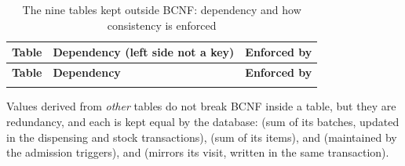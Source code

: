 {\scriptsize
\begin{longtable}{@{}R{3.2cm}R{5.0cm}R{8.6cm}@{}}
\caption{The nine tables kept outside BCNF: dependency and how consistency is enforced}\label{tab:kept}\\
\toprule
\textbf{Table} & \textbf{Dependency (left side not a key)} & \textbf{Enforced by} \\\midrule\endfirsthead
\toprule\textbf{Table} & \textbf{Dependency} & \textbf{Enforced by} \\\midrule\endhead
{}
\bottomrule
\end{longtable}}

Values derived from \emph{other} tables do not break BCNF inside a table, but they are redundancy, and each is kept
equal by the database:  (sum of its batches, updated in the dispensing and stock
transactions),  (sum of its items),  and 
(maintained by the admission triggers), and  (mirrors its visit, written in the same
transaction).
